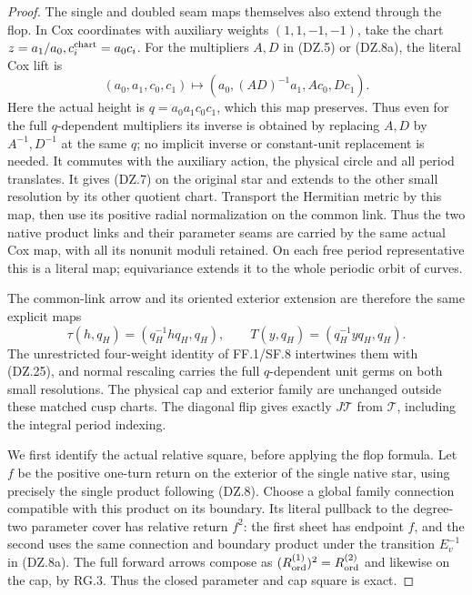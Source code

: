 \begin{proof}
The single and doubled seam maps themselves also extend through
the flop. In Cox
coordinates with auxiliary weights \((1,1,-1,-1)\), take the
chart \(z=a_1/a_0,c_i^{\rm chart}=a_0c_i\).
For the multipliers \(A,D\) in (DZ.5) or (DZ.8a), the literal Cox lift is
\[
 (a_0,a_1,c_0,c_1)\longmapsto
       (a_0,(AD)^{-1}a_1,Ac_0,Dc_1).               \tag{DZ.25}
\]
Here the actual height is \(q=a_0a_1c_0c_1\), which this map
preserves. Thus even for the full \(q\)-dependent multipliers its
inverse is obtained by replacing \(A,D\) by \(A^{-1},D^{-1}\)
at the same \(q\); no implicit inverse or constant-unit
replacement is needed.
It commutes with the auxiliary action, the physical circle and
all period translates. It gives (DZ.7) on the original star and
extends to the other small resolution by its other quotient
chart. Transport the Hermitian metric by this map, then use its
positive radial normalization on the common link. Thus the
two native product links and their parameter seams are carried
by the same actual Cox map, with all its nonunit moduli retained.
On each free period representative this is a literal map;
equivariance extends it to the whole periodic orbit of curves.

The common-link arrow and its oriented exterior extension are
therefore the same explicit maps
\[
 \tau(h,q_H)=(q_H^{-1}hq_H,q_H),\qquad
 T(y,q_H)=(q_H^{-1}yq_H,q_H) .
\]
The unrestricted four-weight identity of FF.1/SF.8 intertwines
them with (DZ.25), and normal rescaling carries the full
\(q\)-dependent unit germs on both small resolutions. The
physical cap and exterior family are unchanged outside these
matched cusp charts. The diagonal flip gives exactly
\(J\mathcal T\) from \(\mathcal T\), including the integral
period indexing.

We first identify the actual relative square, before applying the
flop formula. Let \(f\) be the positive one-turn return on the
exterior of the single native star, using precisely the single
product following (DZ.8). Choose a global family connection
compatible with this product on its boundary. Its literal pullback
to the degree-two parameter cover has relative return \(f^2\):
the first sheet has endpoint \(f\), and the second uses the same
connection and boundary product under the transition \(E_v^{-1}\)
in (DZ.8a). The full forward arrows compose as
\((R_{\rm ord}^{(1)})^2=R_{\rm ord}^{(2)}\) and likewise on the
cap, by RG.3. Thus the closed parameter and cap square is exact.


\end{proof}
